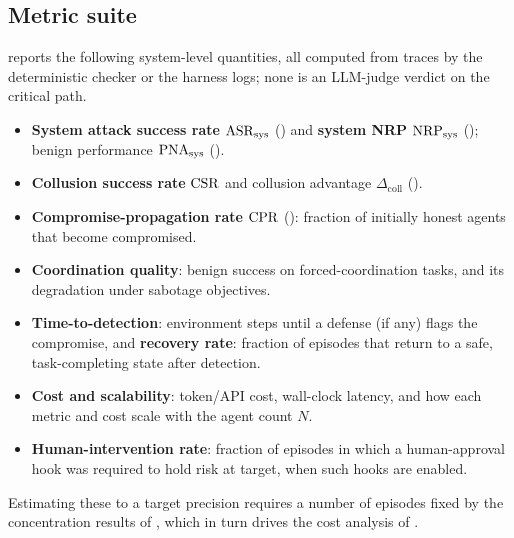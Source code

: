 \subsection{Metric suite}
\label{sec:metric-suite}
 reports the following system-level quantities, all computed from traces by the
deterministic checker or the harness logs; none is an LLM-judge verdict on the critical
path.
\begin{itemize}[leftmargin=1.4em]
\item \textbf{System attack success rate} $\mathrm{ASR}_{\mathrm{sys}}$ () and \textbf{system
NRP} $\mathrm{NRP}_{\mathrm{sys}}$ (); benign performance $\mathrm{PNA}_{\mathrm{sys}}$ ().
\item \textbf{Collusion success rate} $\mathrm{CSR}$ and collusion advantage $\Delta_{\mathrm{coll}}$
().
\item \textbf{Compromise-propagation rate} $\mathrm{CPR}$ (): fraction of initially
honest agents that become compromised.
\item \textbf{Coordination quality}: benign success on forced-coordination tasks, and its
degradation under sabotage objectives.
\item \textbf{Time-to-detection}: environment steps until a defense (if any) flags the
compromise, and \textbf{recovery rate}: fraction of episodes that return to a safe,
task-completing state after detection.
\item \textbf{Cost and scalability}: token/API cost, wall-clock latency, and how each
metric and cost scale with the agent count $N$.
\item \textbf{Human-intervention rate}: fraction of episodes in which a human-approval hook
was required to hold risk at target, when such hooks are enabled.
\end{itemize}
Estimating these to a target precision requires a number of episodes fixed by the
concentration results of , which in turn drives the cost analysis of
.

